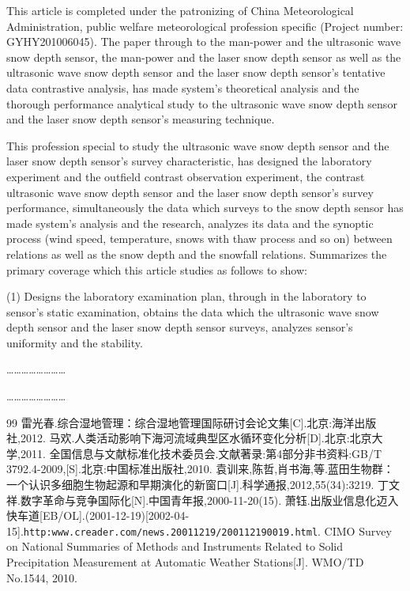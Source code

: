 \documentclass{cuitthesis}
\begin{document}
\begin{cuitabstracten}
This article is completed under the patronizing of China Meteorological Administration, public welfare meteorological profession specific (Project number: GYHY201006045). The paper through to the man-power and the ultrasonic wave snow depth sensor, the man-power and the laser snow depth sensor as well as the ultrasonic wave snow depth sensor and the laser snow depth sensor's tentative data contrastive analysis, has made system's theoretical analysis and the thorough performance analytical study to the ultrasonic wave snow depth sensor and the laser snow depth sensor's measuring technique.

This profession special to study the ultrasonic wave snow depth sensor and the laser snow depth sensor's survey characteristic, has designed the laboratory experiment and the outfield contrast observation experiment, the contrast ultrasonic wave snow depth sensor and the laser snow depth sensor's survey performance, simultaneously the data which surveys to the snow depth sensor has made system's analysis and the research, analyzes its data and the synoptic process (wind speed, temperature, snows with thaw process and so on) between relations as well as the snow depth and the snowfall relations. Summarizes the primary coverage which this article studies as follows to show:

(1) Designs the laboratory examination plan, through in the laboratory to sensor's static examination, obtains the data which the ultrasonic wave snow depth sensor and the laser snow depth sensor surveys, analyzes sensor's uniformity and the stability.

……………………

……………………
\end{cuitabstracten}

\cuittableofcontents
\clearpage

\cuitmainmatter



\begin{thebibliography}{99}
 雷光春.综合湿地管理：综合湿地管理国际研讨会论文集[C].北京:海洋出版社,2012.
 马欢.人类活动影响下海河流域典型区水循环变化分析[D].北京:北京大学,2011.
 全国信息与文献标准化技术委员会.文献著录:第4部分非书资料:GB/T 3792.4-2009,[S].北京:中国标准出版社,2010.
 袁训来,陈哲,肖书海,等.蓝田生物群：一个认识多细胞生物起源和早期演化的新窗口[J].科学通报,2012,55(34):3219.
 丁文祥.数字革命与竞争国际化[N].中国青年报,2000-11-20(15).
 萧钰.出版业信息化迈入快车道[EB/OL].(2001-12-19)[2002-04-15].\nolinkurl{http:www.creader.com/news.20011219/200112190019.html}.
 CIMO Survey on National Summaries of Methods and Instruments Related to Solid Precipitation Measurement at Automatic Weather Stations[J]. WMO/TD No.1544, 2010.
\end{thebibliography}
\end{document}
